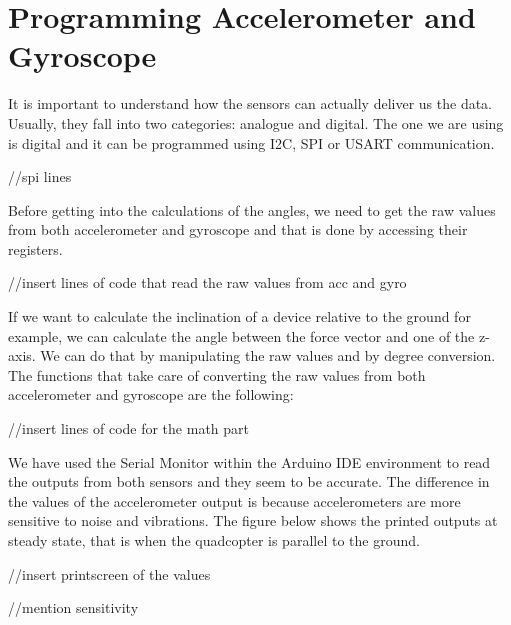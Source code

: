 \section{Programming Accelerometer and Gyroscope}

It is important to understand how the sensors can actually deliver us the data. Usually, they fall into two categories: analogue and digital. The one we are using is digital and it can be programmed using I2C, SPI or USART communication. 

//spi lines

Before getting into the calculations of the angles, we need to get the raw values from both accelerometer and gyroscope and that is done by accessing their registers.

//insert lines of code that read the raw values from acc and gyro

If we want to calculate the inclination of a device relative to the ground for example, we can calculate the angle between the force vector and one of the z-axis. We can do that by manipulating the raw values and by degree conversion. The functions that take care of converting the raw values from both accelerometer and gyroscope are the following:

//insert lines of code for the math part

We have used the Serial Monitor within the Arduino IDE environment to read the outputs from both sensors and they seem to be accurate. The difference in the values of the accelerometer output is because accelerometers are more sensitive to noise and vibrations. The figure below shows the printed outputs at steady state, that is when the quadcopter is parallel to the ground.

//insert printscreen of the values


//mention sensitivity 